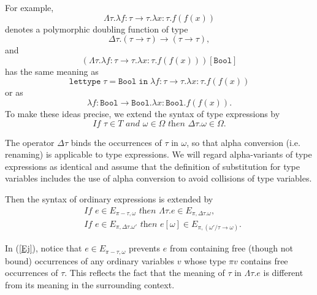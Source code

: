 \documentclass[sigplan,screen,nonacm,balance=false]{acmart}
\makeatletter
\theoremstyle{plain}
\newcommand{\ie}{i.e.\@\xspace}
\newcommand{\Bool}{\mathtt{Bool}}
\newcommand{\lettypein}[3]{\mathtt{lettype} \; #1 = #2 \; \mathtt{in} \; #3}
\makeatother
\begin{document}
For example,
%
\begin{equation*}
  \Lambda \tau. \lambda f: \tau \to \tau. \lambda x: \tau. f(f(x))
\end{equation*}
%
denotes a polymorphic doubling function of type
%
\begin{equation*}
  \Delta \tau. (\tau \to \tau) \to (\tau \to \tau),
\end{equation*}
%
and
%
\begin{equation*}
  (\Lambda \tau. \lambda f: \tau \to \tau. \lambda x: \tau. f(f(x)))[\Bool]
\end{equation*}
%
has the same meaning as
%
\begin{equation*}
  \lettypein{\tau}{\Bool}{\lambda f: \tau \to \tau. \lambda x: \tau. f(f(x))}
\end{equation*}
%
or as
%
\begin{equation*}
  \lambda f: \Bool \to \Bool. \lambda x: \Bool. f(f(x)).
\end{equation*}
%
To make these ideas precise, we extend the syntax of type expressions by
%
\begin{equation*}\tag{$\Omega 5$}
  \textit{If } \tau \in T \textit{ and } \omega \in \Omega \textit{ then } \Delta \tau. \omega \in \Omega.
\end{equation*}

The operator $\Delta \tau$ binds the occurrences of $\tau$ in $\omega$, so that alpha conversion (\ie renaming) is applicable to type expressions.
We will regard alpha-variants of type expressions as identical and assume that the definition of substitution for type variables includes the use of alpha conversion to avoid collisions of type variables.

Then the syntax of ordinary expressions is extended by
%
\begin{align*}
  \tag{Ej} \label{Ej}
  & \textit{If } e \in E_{\pi - \tau, \omega} \textit{ then } \Lambda \tau. e \in E_{\pi, \Delta \tau. \omega}, \\
  \tag{Ek}
  & \textit{If } e \in E_{\pi, \Delta \tau. \omega'} \textit{ then } e[\omega] \in E_{\pi, (\omega'/\tau \to \omega)}.
\end{align*}

In (\ref{Ej}), notice that $e \in E_{\pi - \tau, \omega}$ prevents $e$ from containing free (though not bound) occurrences of any ordinary variables $v$ whose type $\pi v$ contains free occurrences of $\tau$.
This reflects the fact that the meaning of $\tau$ in $\Lambda \tau. e$ is different from its meaning in the surrounding context.
\end{document}
